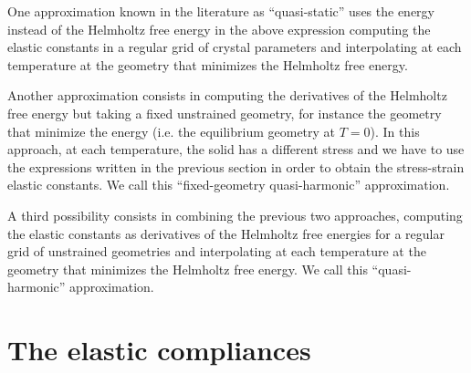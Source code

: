 \documentclass[12pt,a4paper,twoside]{report}
\begin{document}
One approximation known in the literature as ``quasi-static'' 
uses the energy instead of the Helmholtz free energy 
in the above expression computing the elastic constants in a regular grid of
crystal parameters and interpolating at each temperature at the geometry
that minimizes the Helmholtz free energy.

Another approximation consists in computing the derivatives of the
Helmholtz free energy but taking a fixed unstrained geometry, for instance 
the geometry that minimize the energy (i.e. the equilibrium geometry 
at $T=0$). In this approach, at each temperature, the solid has a different 
stress and we have to use the expressions written in the previous section 
in order to obtain the stress-strain elastic constants. We call 
this ``fixed-geometry quasi-harmonic'' approximation.

A third possibility consists in combining the previous two approaches,
computing the elastic constants as derivatives of the Helmholtz free
energies for a regular grid of unstrained geometries and interpolating at 
each temperature at the geometry that minimizes the Helmholtz free energy.
We call this ``quasi-harmonic'' approximation.

%
%
\newpage
{\color{dark-blue}\chapter{The elastic compliances}}
\color{black}
\end{document}

